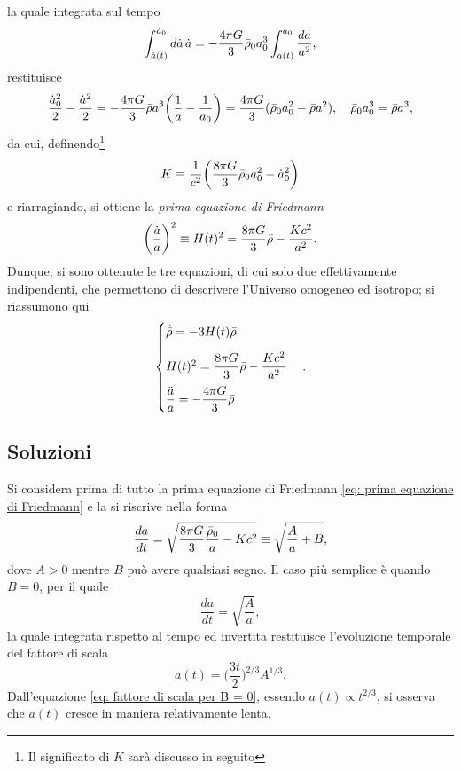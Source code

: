 la quale integrata sul tempo 
\begin{equation}
    \int_{\dot{a}(t)}^{\dot{a}_0}d\dot{a}\,\dot{a} = -\frac{4\pi G}{3}\bar{\rho}_0a_0^3\int_{a(t)}^{a_0}\frac{da}{a^2},
\end{equation}
restituisce 
\begin{equation}
    \frac{\dot{a}_0^2}{2} - \frac{\dot{a}^2}{2} = -\frac{4\pi G}{3}\bar{\rho}a^3\bigg(\frac{1}{a} - \frac{1}{a_0}\bigg) = \frac{4\pi G}{3}(\bar{\rho}_0a_0^2 - \bar{\rho}a^2),\quad \bar{\rho}_0a_0^3 = \bar{\rho}a^3,
\end{equation}
da cui, definendo\footnote{Il significato di $K$ sarà discusso in seguito}
\begin{equation}
    K \equiv \frac{1}{c^2}\bigg(\frac{8\pi G}{3}\bar{\rho}_0a_0^2 - \dot{a}^2_0\bigg)
\end{equation}
e riarragiando, si ottiene la \emph{prima equazione di Friedmann}
\begin{equation}
\label{eq: prima equazione di Friedmann}
    \bigg(\frac{\dot{a}}{a}\bigg)^2 \equiv H(t)^2 = \frac{8\pi G}{3}\bar{\rho} - \frac{Kc^2}{a^2}.
\end{equation}
Dunque, si sono ottenute le tre equazioni, di cui solo due effettivamente indipendenti, che permettono di descrivere l'Universo omogeneo ed isotropo; si riassumono qui
\begin{equation}
    \begin{cases}
        \dot{\bar{\rho}} = -3H(t)\bar{\rho} \\[2ex]
        H(t)^2 = \dfrac{8\pi G}{3}\bar{\rho} - \dfrac{Kc^2}{a^2} \\[2ex]
        \dfrac{\ddot{a}}{a} = -\dfrac{4\pi G}{3}\bar{\rho}
    \end{cases}.
\end{equation}

\subsection{Soluzioni}
Si considera prima di tutto la prima equazione di Friedmann \eqref{eq: prima equazione di Friedmann} e la si riscrive nella forma 
\begin{equation}
    \frac{da}{dt} = \sqrt{\frac{8\pi G}{3}\frac{\bar{\rho}_0}{a} - Kc^2} \equiv \sqrt{\frac{A}{a} + B},
\end{equation}
dove $A > 0$ mentre $B$ può avere qualsiasi segno. Il caso più semplice è quando $B = 0$, per il quale 
\begin{equation}
    \frac{da}{dt} = \sqrt{\frac{A}{a}},
\end{equation}
la quale integrata rispetto al tempo ed invertita restituisce l'evoluzione temporale del fattore di scala
\begin{equation}
\label{eq: fattore di scala per B = 0}
    a(t) = \bigg(\frac{3t}{2}\bigg)^{2/3}A^{1/3}.
\end{equation}
Dall'equazione \eqref{eq: fattore di scala per B = 0}, essendo $a(t) \propto t^{2/3}$, si osserva che $a(t)$ cresce in maniera relativamente lenta. 

